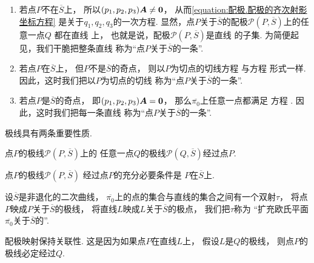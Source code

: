 \begingroup
{}
\begin{enumerate}[label={{\rm\bf 情形}\arabic*.}]
	\item
	若点\(P\)不在\(\overline{S}\)上，
	所以\((p_1,p_2,p_3) \boldsymbol{A} \neq \boldsymbol0\)，
	从而\cref{equation:配极.配极的齐次射影坐标方程}
	是关于\(q_1,q_2,q_3\)的一次方程.
	显然，点\(P\)关于\(\overline{S}\)的配极\(\mathcal{P}(P,\overline{S})\)上的任意一点\(Q\)
	都在直线  上，
	也就是说，配极\(\mathcal{P}(P,\overline{S})\)是直线  的子集.
	为简便起见，我们干脆把整条直线 
	称为“点\(P\)关于\(\overline{S}\)的一条”.

	\item
	若点\(P\)在\(\overline{S}\)上，
	但\(P\)不是\(\overline{S}\)的奇点，
	则以\(P\)为切点的切线方程 
	与方程  形式一样.
	因此，这时我们把以\(P\)为切点的切线
	称为“点\(P\)关于\(\overline{S}\)的一条”.

	\item
	若点\(P\)是\(\overline{S}\)的奇点，
	即\((p_1,p_2,p_3) \boldsymbol{A} = \boldsymbol0\)，
	那么\(\overline{\pi_0}\)上任意一点都满足
	方程 .
	因此，这时我们把每一条直线
	称为“点\(P\)关于\(\overline{S}\)的一条”.
\end{enumerate}
\endgroup

极线具有两条重要性质.
\begin{property}
点\(P\)的极线\(\mathcal{P}(P,\overline{S})\)上的
任意一点\(Q\)的极线\(\mathcal{P}(Q,\overline{S})\)经过点\(P\).
\end{property}

\begin{property}
点\(P\)的极线\(\mathcal{P}(P,\overline{S})\)
经过点\(P\)的充分必要条件是
\(P\)在\(\overline{S}\)上.
\end{property}

\begin{definition}
设\(\overline{S}\)是非退化的二次曲线，
\(\overline{\pi_0}\)上的点的集合与直线的集合之间有一个双射\(\tau\)，
将点\(P\)映成\(P\)关于\(\overline{S}\)的极线，
将直线\(L\)映成\(L\)关于\(\overline{S}\)的极点，
我们把\(\tau\)称为
“扩充欧氏平面\(\overline{\pi_0}\)关于\(\overline{S}\)的”.
\end{definition}

配极映射保持关联性.
这是因为如果点\(P\)在直线\(L\)上，
假设\(L\)是\(Q\)的极线，
则点\(P\)的极线必定经过\(Q\).
